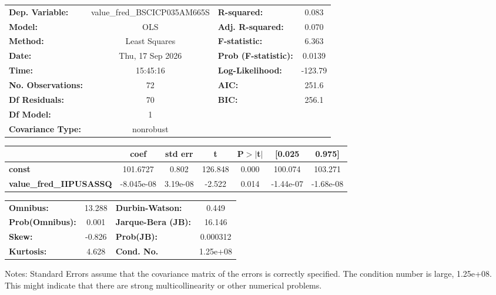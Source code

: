 \begin{center}
\begin{tabular}{lclc}
\toprule
\textbf{Dep. Variable:}         & value\_fred\_BSCICP035AM665S & \textbf{  R-squared:         } &     0.083   \\
\textbf{Model:}                 &             OLS              & \textbf{  Adj. R-squared:    } &     0.070   \\
\textbf{Method:}                &        Least Squares         & \textbf{  F-statistic:       } &     6.363   \\
\textbf{Date:}                  &       Thu, 17 Sep 2026       & \textbf{  Prob (F-statistic):} &   0.0139    \\
\textbf{Time:}                  &           15:45:16           & \textbf{  Log-Likelihood:    } &   -123.79   \\
\textbf{No. Observations:}      &                72            & \textbf{  AIC:               } &     251.6   \\
\textbf{Df Residuals:}          &                70            & \textbf{  BIC:               } &     256.1   \\
\textbf{Df Model:}              &                 1            & \textbf{                     } &             \\
\textbf{Covariance Type:}       &          nonrobust           & \textbf{                     } &             \\
\bottomrule
\end{tabular}
\begin{tabular}{lcccccc}
                                & \textbf{coef} & \textbf{std err} & \textbf{t} & \textbf{P$> |$t$|$} & \textbf{[0.025} & \textbf{0.975]}  \\
\midrule
\textbf{const}                  &     101.6727  &        0.802     &   126.848  &         0.000        &      100.074    &      103.271     \\
\textbf{value\_fred\_IIPUSASSQ} &   -8.045e-08  &     3.19e-08     &    -2.522  &         0.014        &    -1.44e-07    &    -1.68e-08     \\
\bottomrule
\end{tabular}
\begin{tabular}{lclc}
\textbf{Omnibus:}       & 13.288 & \textbf{  Durbin-Watson:     } &    0.449  \\
\textbf{Prob(Omnibus):} &  0.001 & \textbf{  Jarque-Bera (JB):  } &   16.146  \\
\textbf{Skew:}          & -0.826 & \textbf{  Prob(JB):          } & 0.000312  \\
\textbf{Kurtosis:}      &  4.628 & \textbf{  Cond. No.          } & 1.25e+08  \\
\bottomrule
\end{tabular}
\end{center}

Notes: \newline
 [1] Standard Errors assume that the covariance matrix of the errors is correctly specified. \newline
 [2] The condition number is large, 1.25e+08. This might indicate that there are \newline
 strong multicollinearity or other numerical problems.